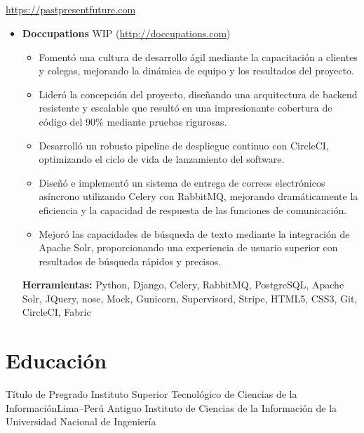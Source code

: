 \documentclass[11pt,a4paper,english]{moderncv}
\begin{document}
\subsection{}

{
    \url{https://pastpresentfuture.com}
\newline{}
\begin{itemize}
    \item \textbf{Doccupations}
        \newline{}
        WIP (\url{http://doccupations.com})
        \begin{itemize}
            \item Fomentó una cultura de desarrollo ágil mediante la capacitación a clientes y colegas, mejorando la dinámica de equipo y los resultados del proyecto.
            \item Lideró la concepción del proyecto, diseñando una arquitectura de backend resistente y escalable que resultó en una impresionante cobertura de código del 90\% mediante pruebas rigurosas.
            \item Desarrolló un robusto pipeline de despliegue continuo con CircleCI, optimizando el ciclo de vida de lanzamiento del software.
            \item Diseñó e implementó un sistema de entrega de correos electrónicos asíncrono utilizando Celery con RabbitMQ, mejorando dramáticamente la eficiencia y la capacidad de respuesta de las funciones de comunicación.
            \item Mejoró las capacidades de búsqueda de texto mediante la integración de Apache Solr, proporcionando una experiencia de usuario superior con resultados de búsqueda rápidos y precisos.
        \end{itemize}
        \textbf{Herramientas:} Python, Django, Celery, RabbitMQ, PostgreSQL, Apache Solr, JQuery, nose, Mock, Gunicorn, Supervisord, Stripe, HTML5, CSS3, Git, CircleCI, Fabric
\end{itemize}
}

\subsection{}

\section{Educación}
    {Título de Pregrado}
    {Instituto Superior Tecnológico de Ciencias de la Información}{Lima--Perú}
    {}{Antiguo Instituto de Ciencias de la Información de la Universidad Nacional de Ingeniería}
\end{document}
